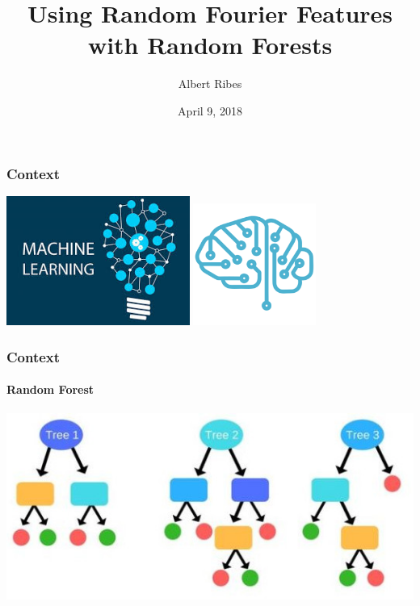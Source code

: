 \documentclass{beamer}
\title{Using Random Fourier Features with Random Forests}
\author{Albert Ribes}
\institute{UPC --- FIB}
\date{April 9, 2018}
\begin{document}
\frame{\titlepage}

\begin{frame}
\frametitle{Context}


\includegraphics[width=0.45\textwidth]{machine_learning}%
\hfill
\includegraphics[width=4cm]{brain}
\end{frame}

\begin{frame}
\frametitle{Context}
\framesubtitle{Random Forest}

\includegraphics[width=\textwidth]{random_forest_3}

\end{frame}
\end{document}
